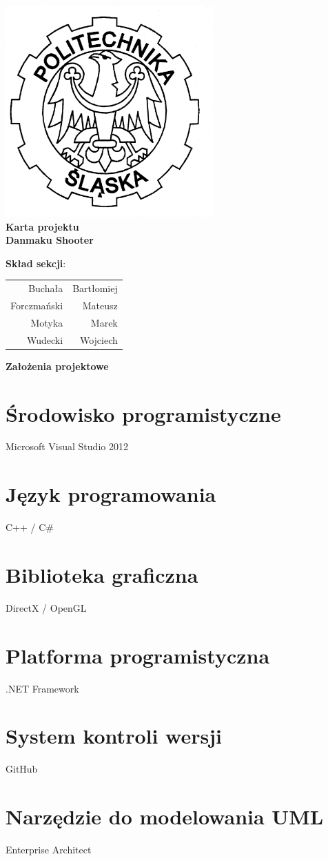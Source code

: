 \documentclass[a4paper,twoside]{article}
\begin{document}
\begin{titlepage}
	\centering
	\includegraphics[width=0.6\textwidth]{./images/logo.png}
	\\\vspace{10mm}
	\textbf{{\huge Karta projektu}}\\\vspace{5mm}
	\textbf{{\Huge Danmaku Shooter}}
	\\
	\vfill
	\begin{flushright}
			{\Large \textbf{Skład sekcji}:}\\
		\begin{tabular}{rr}
			{\Large Buchała} & {\Large Bartłomiej}\\[-3pt]
			{\Large Forczmański} & {\Large Mateusz}\\[-3pt]
			{\Large Motyka} & {\Large Marek}\\[-3pt]
			{\Large Wudecki} & {\Large Wojciech}
		\end{tabular}
	\end{flushright}
	
\end{titlepage}



\begin{center}
	{\huge \textbf{Założenia projektowe}}
\end{center}
\section{Środowisko programistyczne}
{\Large Microsoft Visual Studio 2012}
\section{Język programowania}
{\Large C++ / C\#}
\section{Biblioteka graficzna}
{\Large DirectX / OpenGL}
\section{Platforma programistyczna}
{\Large .NET Framework}
\section{System kontroli wersji}
{\Large GitHub}
\section{Narzędzie do modelowania UML}
{\Large Enterprise Architect}
\end{document}
